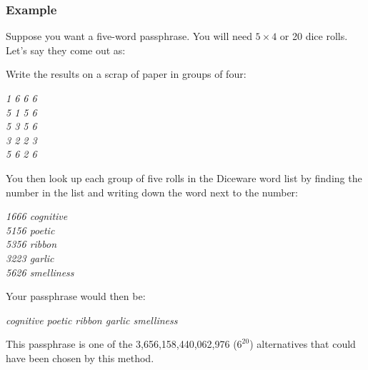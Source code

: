 \newpage

\setlength{\parskip}{0.5em}

\subsubsection*{Example}

Suppose you want a five-word passphrase. You will need $5 \times 4$ or 20 dice rolls. Let's say they come out as:

\begin{adjustwidth}{2em}{2em}
\end{adjustwidth}

Write the results on a scrap of paper in groups of four:

\begin{adjustwidth}{2em}{2em}
\textit{1 6 6 6 \\
5 1 5 6 \\
5 3 5 6 \\
3 2 2 3 \\
5 6 2 6}
\end{adjustwidth}

You then look up each group of five rolls in the Diceware word list by finding the number in the list and writing down the word next to the number:

\begin{adjustwidth}{2em}{2em}
\textit{1666 cognitive \\
5156 poetic \\
5356 ribbon \\
3223 garlic \\
5626 smelliness}
\end{adjustwidth}

Your passphrase would then be:

\begin{adjustwidth}{2em}{2em}
\textit{cognitive poetic ribbon garlic smelliness}
\end{adjustwidth}

This passphrase is one of the 3,656,158,440,062,976 ($6^{20}$) alternatives that could have been chosen by this method.

\setlength{\parskip}{0.25em}
